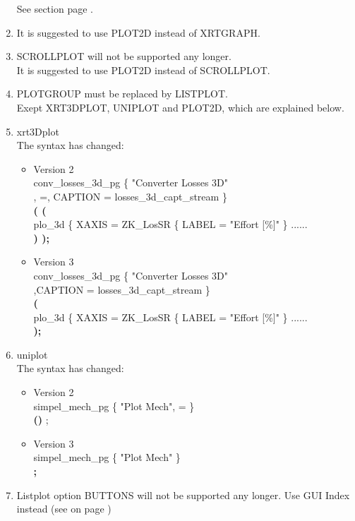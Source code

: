 \begin{enumerate}
See section  page \pageref{sec:uiplot2d}. \\
\item It is suggested to use PLOT2D instead of XRTGRAPH. \\
\item 
  SCROLLPLOT will not be supported any longer. \\
  It is suggested to use PLOT2D instead of SCROLLPLOT. \\
\item 
PLOTGROUP must be replaced by LISTPLOT. \\
  Exept XRT3DPLOT, UNIPLOT and PLOT2D, which are explained below.\\
\item xrt3Dplot \\
The syntax has changed:
\begin{itemize}
\item Version 2 \\
  \PLOTGROUP{} conv\_losses\_3d\_pg \{ "Converter Losses 3D" \\
  , \TYPE=\XRTTHREEDPLOT, CAPTION = losses\_3d\_capt\_stream \} \\
  {\bfseries ( (} \\
  plo\_3d \{ XAXIS = ZK\_LosSR \{ LABEL = "Effort [\%]" \} ...... \\
  {\bfseries ) );} \\
\item Version 3 \\
  \XRTTHREEDPLOT conv\_losses\_3d\_pg \{ "Converter Losses 3D" \\
  ,CAPTION = losses\_3d\_capt\_stream \} \\
  {\bfseries (} \\
  plo\_3d \{ XAXIS = ZK\_LosSR \{ LABEL = "Effort [\%]" \} ...... \\
  {\bfseries );} \\
\end{itemize}
\item uniplot \\
The syntax has changed:
\begin{itemize}
\item Version 2 \\
\PLOTGROUP{} simpel\_mech\_pg \{ "Plot Mech", \TYPE=\UNIPLOT{} \} \\
{\bfseries ()} ; \\
\item Version 3 \\
\UNIPLOT{} simpel\_mech\_pg \{ "Plot Mech" \} \\
{\bfseries ;} \\
\end{itemize}
\item Listplot option BUTTONS will not be supported any longer. 
   Use GUI Index instead (see  on page \pageref{sec:uiindex})\\
\end{enumerate}
